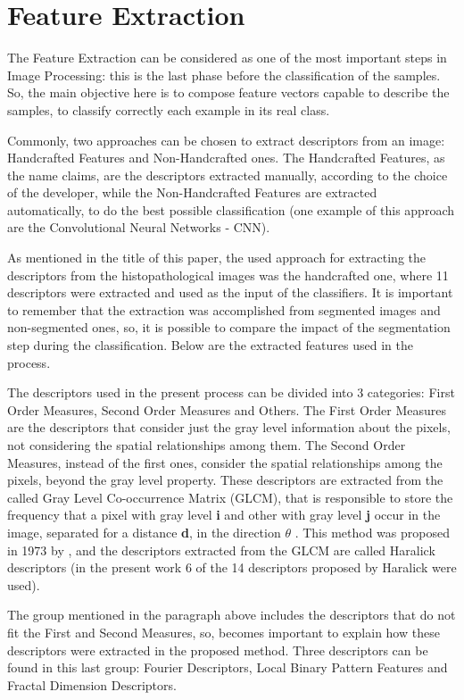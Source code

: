 \documentclass[conference]{IEEEtran}
\begin{document}
	\section{Feature Extraction}
        \par The Feature Extraction can be considered as one of the most important steps in Image Processing: this is the last phase before the classification of the samples. So, the main objective here is to compose feature vectors capable to describe the samples, to classify correctly each example in its real class.
        \par Commonly, two approaches can be chosen to extract descriptors from an image: Handcrafted Features and Non-Handcrafted ones. The Handcrafted Features, as the name claims, are the descriptors extracted manually, according to the choice of the developer, while the Non-Handcrafted Features are extracted automatically, to do the best possible classification (one example of this approach are the Convolutional Neural Networks - CNN).
		\par As mentioned in the title of this paper, the used approach for extracting the descriptors from the histopathological images was the handcrafted one, where 11 descriptors were extracted and used as the input of the classifiers. It is important to remember that the extraction was accomplished from segmented images and non-segmented ones, so, it is possible to compare the impact of the segmentation step during the classification. Below are the extracted features used in the process.
		\par The descriptors used in the present process can be divided into 3 categories: First Order Measures, Second Order Measures and Others. The First Order Measures are the descriptors that consider just the gray level information about the pixels, not considering the spatial relationships among them. The Second Order Measures, instead of the first ones, consider the spatial relationships among the pixels, beyond the gray level property. These descriptors are extracted from the called Gray Level Co-occurrence Matrix (GLCM), that is responsible to store the frequency that a pixel with gray level \textbf{i} and other with gray level \textbf{j} occur in the image, separated for a distance \textbf{d}, in the direction\textbf{ $\theta$} \cite{conci2008computacao}. This method was proposed in 1973 by \cite{haralick:smc1973}, and the descriptors extracted from the GLCM are called Haralick descriptors (in the present work 6 of the 14 descriptors proposed by Haralick were used).
		\par The group mentioned in the paragraph above includes the descriptors that do not fit the First and Second Measures, so, becomes important to explain how these descriptors were extracted in the proposed method. Three descriptors can be found in this last group: Fourier Descriptors, Local Binary Pattern Features and Fractal Dimension Descriptors. 
\end{document}
